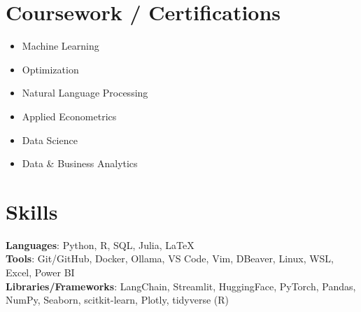 \documentclass[letterpaper,11pt]{article}
\makeatletter
\newcommand{\resumeItem}[1]{
  \item\small{
    {#1 \vspace{-2pt}}
  }
}
\newcommand{\resumeSubheading}[4]{
  \vspace{-2pt}\item
    \begin{tabular*}{1.0\textwidth}[t]{l@{\extracolsep{\fill}}r}
      \textbf{#1} & \small #2 \\
      \textit{\small#3} & \textit{\small #4} \\
    \end{tabular*}\vspace{-7pt}
}
\newcommand{\resumeSubHeadingListStart}{\begin{itemize}[leftmargin=0.0in, label={}]}
\newcommand{\resumeSubHeadingListEnd}{\end{itemize}}
\newcommand{\resumeItemListStart}{\begin{itemize}}
\newcommand{\resumeItemListEnd}{\end{itemize}\vspace{-5pt}}
\makeatother
\begin{document}
\newpage

\section{Coursework / Certifications}
        \begin{multicols}{3}
            \begin{itemize}[itemsep=-5pt, parsep=3pt]
                \item\small Machine Learning  
                \item Optimization
                \item Natural Language Processing
                \item Applied Econometrics
                \item Data Science 
                \item Data \& Business Analytics
            \end{itemize}
        \end{multicols}

\section{Skills}
  \begin{itemize}[leftmargin=0.15in, label={}]
      \small{\item{
      \textbf{Languages}{: Python, R, SQL, Julia, \LaTeX} \\
      \textbf{Tools}{: Git/GitHub, Docker, Ollama, VS Code, Vim, DBeaver, Linux, WSL, Excel, Power BI} \\
      \textbf{Libraries/Frameworks}{: LangChain, Streamlit, HuggingFace, PyTorch, Pandas, NumPy, Seaborn, scitkit-learn, Plotly, tidyverse (R)}  \\
      }}
  \end{itemize} 

\end{document}
